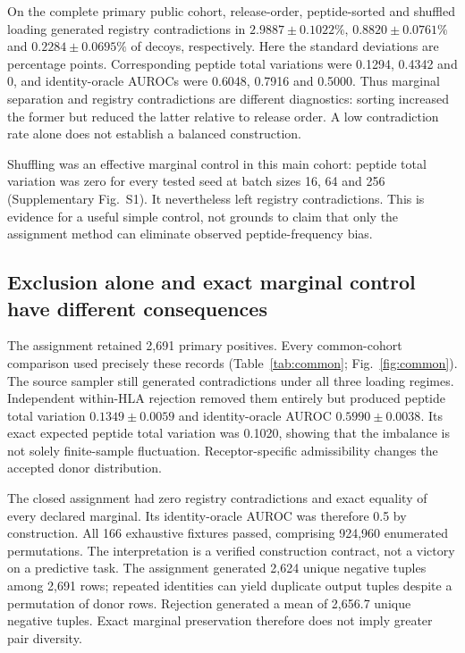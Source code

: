 \documentclass[pdflatex,sn-basic,Numbered]{sn-jnl}
\begin{document}
On the complete primary public cohort, release-order, peptide-sorted and shuffled loading generated registry contradictions in $2.9887\pm0.1022\%$, $0.8820\pm0.0761\%$ and $0.2284\pm0.0695\%$ of decoys, respectively. Here the standard deviations are percentage points. Corresponding peptide total variations were 0.1294, 0.4342 and 0, and identity-oracle AUROCs were 0.6048, 0.7916 and 0.5000. Thus marginal separation and registry contradictions are different diagnostics: sorting increased the former but reduced the latter relative to release order. A low contradiction rate alone does not establish a balanced construction.

Shuffling was an effective marginal control in this main cohort: peptide total variation was zero for every tested seed at batch sizes 16, 64 and 256 (Supplementary Fig.~S1). It nevertheless left registry contradictions. This is evidence for a useful simple control, not grounds to claim that only the assignment method can eliminate observed peptide-frequency bias.

\subsection{Exclusion alone and exact marginal control have different consequences}
The assignment retained 2,691 primary positives. Every common-cohort comparison used precisely these records (Table~\ref{tab:common}; Fig.~\ref{fig:common}). The source sampler still generated contradictions under all three loading regimes. Independent within-HLA rejection removed them entirely but produced peptide total variation $0.1349\pm0.0059$ and identity-oracle AUROC $0.5990\pm0.0038$. Its exact expected peptide total variation was 0.1020, showing that the imbalance is not solely finite-sample fluctuation. Receptor-specific admissibility changes the accepted donor distribution.

The closed assignment had zero registry contradictions and exact equality of every declared marginal. Its identity-oracle AUROC was therefore 0.5 by construction. All 166 exhaustive fixtures passed, comprising 924,960 enumerated permutations. The interpretation is a verified construction contract, not a victory on a predictive task. The assignment generated 2,624 unique negative tuples among 2,691 rows; repeated identities can yield duplicate output tuples despite a permutation of donor rows. Rejection generated a mean of 2,656.7 unique negative tuples. Exact marginal preservation therefore does not imply greater pair diversity.
\end{document}
